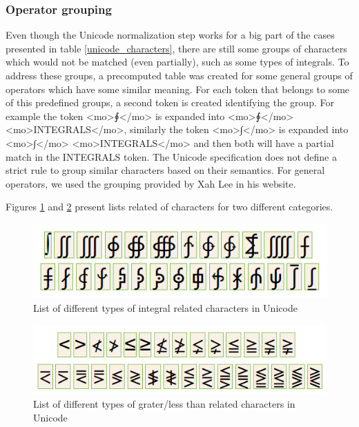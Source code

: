 \subsubsection{Operator grouping}
Even though the Unicode normalization step works for a big part of the cases presented in table \ref{unicode_characters}, there are still some groups of characters which would not be matched (even partially), such as some types of integrals. To address these groups, a precomputed table was created for some general groups of operators which have some similar meaning. For each token that belongs to some of this predefined groups, a second token is created identifying the group.
For example the token <mo>{\unicodefont ∮}</mo> is expanded into <mo>{\unicodefont ∮}</mo> <mo>INTEGRALS</mo>, similarly the token <mo>{\unicodefont ∫}</mo> is expanded into <mo>{\unicodefont ∫}</mo> <mo>INTEGRALS</mo> and then both will have a partial match in the INTEGRALS token. 
The Unicode specification does not define a strict rule to group similar characters based on their semantics. For general operators, we used the grouping provided by Xah Lee in his website\cite{math_groups}.

Figures \ref{integrals} and \ref{less_greater} present lists related of characters for two different categories.

\begin{figure}[h!]
	\centering
	\includegraphics[height=2 cm]{figures/integrals.png}
	\caption{List of different types of integral related characters in Unicode}
	\label{integrals}
\end{figure}

\begin{figure}[h!]
	\centering
	\includegraphics[height=2 cm]{figures/greater_less.png}
	\caption{List of different types of grater/less than related characters in Unicode}
	\label{less_greater}
\end{figure}

